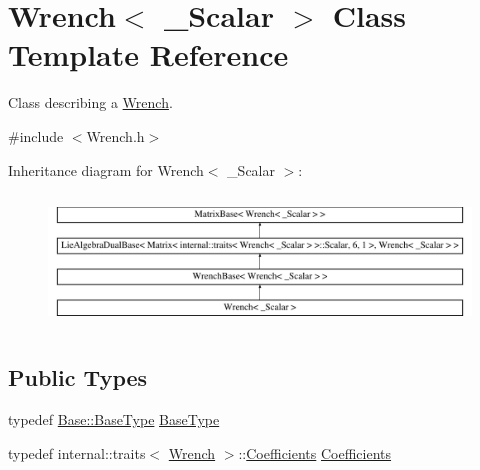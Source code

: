 \hypertarget{class_wrench}{}\section{Wrench$<$ \+\_\+\+Scalar $>$ Class Template Reference}
\label{class_wrench}


Class describing a \hyperlink{class_wrench}{Wrench}.  




{\ttfamily \#include $<$Wrench.\+h$>$}

Inheritance diagram for Wrench$<$ \+\_\+\+Scalar $>$\+:\begin{figure}[H]
\begin{center}
\leavevmode
\includegraphics[height=3.578275cm]{class_wrench}
\end{center}
\end{figure}
\subsection*{Public Types}
\begin{DoxyCompactItemize}
\item 
typedef \hyperlink{class_wrench_base_a8b98c467c6fb31bd7354dcbef134dca1}{Base\+::\+Base\+Type} \hyperlink{class_wrench_abc5de6653f57de3beb6335e474fc2802}{Base\+Type}
\item 
typedef internal\+::traits$<$ \hyperlink{class_wrench}{Wrench} $>$\+::\hyperlink{class_wrench_a3b7401ec055bd386fc3dc826308784e8}{Coefficients} \hyperlink{class_wrench_a3b7401ec055bd386fc3dc826308784e8}{Coefficients}
\end{DoxyCompactItemize}
